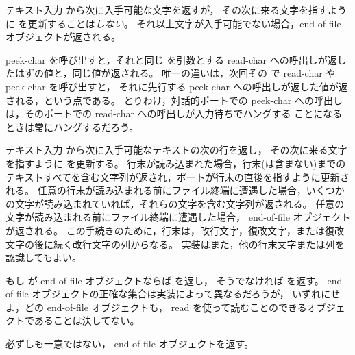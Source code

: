 \begin{entry}{%
}

テキスト入力  から次に入手可能な文字を返すが，
その次に来る文字を指すように  を更新することは{\em しない}。
それ以上文字が入手可能でない場合，end-of-file オブジェクトが返される。

\begin{note}
{\cf peek-char} を呼び出すと，それと同じ  を引数とする {\cf read-char} への呼出しが返したはずの値と，同じ値が返される。
唯一の違いは，次回その  で {\cf read-char} や {\cf peek-char} を呼び出すと，
それに先行する {\cf peek-char} への呼出しが返した値が返される，という点である。
とりわけ，対話的ポートでの {\cf peek-char} への呼出しは，そのポートでの {\cf read-char} への呼出しが入力待ちでハングする
ことになるときは常にハングするだろう。
\end{note}

\end{entry}

\begin{entry}{%
}

テキスト入力  から次に入手可能なテキストの次の行を返し，
その次に来る文字を指すように  を更新する。
行末が読み込まれた場合，行末(は含まない)までのテキストすべてを含む文字列が返され，ポートが行末の直後を指すように更新される。
任意の行末が読み込まれる前にファイル終端に遭遇した場合，いくつかの文字が読み込まれていれば，それらの文字を含む文字列が返される。
任意の文字が読み込まれる前にファイル終端に遭遇した場合， end-of-file オブジェクトが返される。
この手続きのために，行末は，改行文字，復改文字，または復改文字の後に続く改行文字の列からなる。
実装はまた，他の行末文字または列を認識してもよい。

\end{entry}


\begin{entry}{%
}

もし  が end-of-file オブジェクトならば \schtrue{} を返し，
そうでなければ \schfalse を返す。
end-of-file オブジェクトの正確な集合は実装によって異なるだろうが，
いずれにせよ，どの end-of-file オブジェクトも，
{\cf read} を使って読むことのできるオブジェクトであることは決してない。

\end{entry}

\begin{entry}{%
}

必ずしも一意ではない， end-of-file オブジェクトを返す。

\end{entry}


